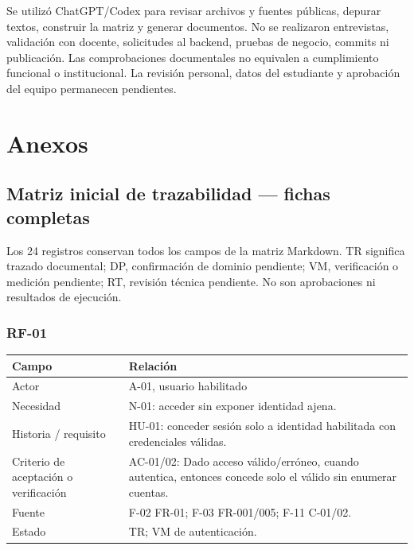 \documentclass[12pt,a4paper]{report}
\begin{document}
Se utilizó ChatGPT/Codex para revisar archivos y fuentes públicas,
depurar textos, construir la matriz y generar documentos. No se
realizaron entrevistas, validación con docente, solicitudes al backend,
pruebas de negocio, commits ni publicación. Las comprobaciones
documentales no equivalen a cumplimiento funcional o institucional. La
revisión personal, datos del estudiante y aprobación del equipo
permanecen pendientes.

\cleardoublepage
\nocite{proyecto,ape2,rfc9110,caces2024,unl2022,wcag22,rfc5789}

\appendix
\chapter{Anexos}
\section{Matriz inicial de trazabilidad --- fichas
completas}\label{matriz-matriz-inicial-de-trazabilidad-fichas-completas}

Los 24 registros conservan todos los campos de la matriz Markdown. TR
significa trazado documental; DP, confirmación de dominio pendiente; VM,
verificación o medición pendiente; RT, revisión técnica pendiente. No
son aprobaciones ni resultados de ejecución.

\subsection{RF-01}\label{matriz-RF-01}

{\def\LTcaptype{none} %
\begin{longtable}[]{@{}
  >{\raggedright\arraybackslash}p{}
  >{\raggedright\arraybackslash}p{}@{}}
\toprule\noalign{}
\begin{minipage}[b]{\linewidth}\raggedright
Campo
\end{minipage} & \begin{minipage}[b]{\linewidth}\raggedright
Relación
\end{minipage} \\
\midrule\noalign{}
\endhead
\bottomrule\noalign{}
\endlastfoot
Actor & A-01, usuario habilitado \\
Necesidad & N-01: acceder sin exponer identidad ajena. \\
Historia / requisito & HU-01: conceder sesión solo a identidad
habilitada con credenciales válidas. \\
Criterio de aceptación o verificación & AC-01/02: Dado acceso
válido/erróneo, cuando autentica, entonces concede solo el válido sin
enumerar cuentas. \\
Fuente & F-02 FR-01; F-03 FR-001/005; F-11 C-01/02. \\
Estado & TR; VM de autenticación. \\
\end{longtable}
}
\end{document}
